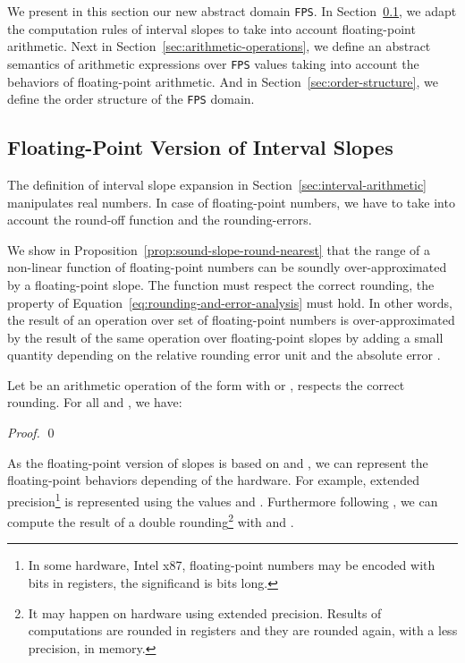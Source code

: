 We present in this section our new abstract domain \texttt{FPS}. In
Section~\ref{sec:floating-point-version-of-interval-slopes}, we adapt
the computation rules of interval slopes to take into account
floating-point arithmetic. Next in
Section~\ref{sec:arithmetic-operations}, we define an abstract
semantics of arithmetic expressions over \texttt{FPS} values taking
into account the behaviors of floating-point arithmetic. And in
Section~\ref{sec:order-structure}, we define the order structure of
the \texttt{FPS} domain.

\subsection{Floating-Point Version of Interval Slopes}
\label{sec:floating-point-version-of-interval-slopes}

The definition of interval slope expansion in
Section~\ref{sec:interval-arithmetic} manipulates real numbers. In
case of floating-point numbers, we have to take into account the
round-off function and the rounding-errors.

We show in Proposition~\ref{prop:sound-slope-round-nearest} that the
range of a non-linear function  of floating-point numbers can
be soundly over-approximated by a floating-point slope. The function
 must respect the correct rounding, \ie the property of
Equation~\eqref{eq:rounding-and-error-analysis} must hold. In other
words, the result of an operation over set of floating-point numbers
is over-approximated by the result of the same operation over
floating-point slopes by adding a small quantity depending on the
relative rounding error unit  and the absolute error .


\begin{proposition}
  \label{prop:sound-slope-round-nearest}
  Let  be an arithmetic
  operation of the form  with  or , \ie  respects the
  correct rounding. For all  and
  , we have: {\small
    
  }
  \begin{proof}
    {\small  
      \qed
    }
  \end{proof}
\end{proposition}

\begin{remark}
  As the floating-point version of slopes is based on  and
  , we can represent the floating-point behaviors depending of
  the hardware. For example, extended precision\footnote{In some
    hardware, \eg Intel x87, floating-point numbers may be encoded
    with  bits in registers, \ie the significand is  bits
    long.} is represented using the values  and
  . Furthermore following \cite{BN10}, we can
  compute the result of a double rounding\footnote{It may happen on
    hardware using extended precision. Results of computations are
    rounded in registers and they are rounded again, with a less
    precision, in memory.}  with  and
  . \end{remark}


